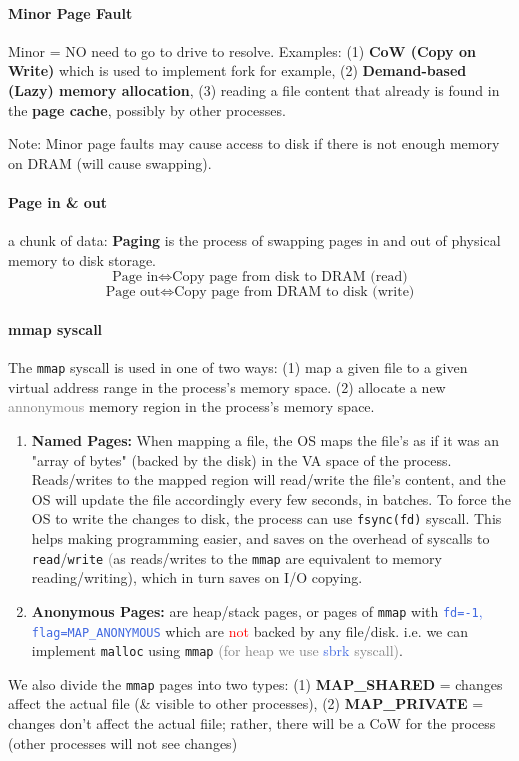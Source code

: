\documentclass[openany,12pt]{book}
\newcommand{\code}[1]{\texttt{#1}}
\newcommand{\red}[1]{\textcolor{Red}{#1}}
\newcommand{\blue}[1]{\textcolor{RoyalBlue}{#1}}
\newcommand{\gray}[1]{\textcolor{gray}{#1}}
\begin{document}
\paragraph{Minor Page Fault} Minor = NO need to go to drive to resolve.
Examples: (1) \textbf{CoW (Copy on Write)} which is used to implement fork for example, (2) \textbf{Demand-based (Lazy) memory allocation}, (3) reading a file content that already is found in the \textbf{page cache}, possibly by other processes.

Note: Minor page faults may cause access to disk if there is not enough memory on DRAM (will cause swapping).

\paragraph{Page in \& out} a chunk of data: \textbf{Paging} is the process of swapping pages in and out of physical memory to disk storage.
$$
\text{Page in} \Longleftrightarrow \text{Copy page from disk to DRAM (read)}
$$
$$
\text{Page out} \Longleftrightarrow \text{Copy page from DRAM to disk (write)}
$$


\paragraph{mmap syscall} The \code{mmap} syscall is used in one of two ways: (1) map a given file to a given virtual address range in the process's memory space. (2) allocate a new \gray{annonymous} memory region in the process's memory space. 
\begin{enumerate}
  \item \textbf{Named Pages:} When mapping a file, the OS maps the file's as if it was an "array of bytes" (backed by the disk) in the VA space of the process. Reads/writes to the mapped region will read/write the file's content, and the OS will update the file accordingly every few seconds, in batches. To force the OS to write the changes to disk, the process can use \code{fsync(fd)} syscall. This helps making programming easier, and saves on the overhead of syscalls to \code{read}/\code{write} \gray(as reads/writes to the \code{mmap} are equivalent to memory reading/writing), which in turn saves on I/O copying.

  \item \textbf{Anonymous Pages:} are heap/stack pages, or pages of \code{mmap} with \blue{\code{fd=-1}, \code{flag=MAP\_ANONYMOUS}} which are \red{not} backed by any file/disk. i.e. we can implement \code{malloc} using \code{mmap} \gray{(for heap we use} \blue{sbrk} \gray{syscall)}.
\end{enumerate}
We also divide the \code{mmap} pages into two types: (1) \textbf{MAP\_SHARED} = changes affect the actual file (\& visible to other processes), (2) \textbf{MAP\_PRIVATE} = changes don't affect the actual fiile; rather, there will be a CoW for the process (other processes will not see changes)
\end{document}
